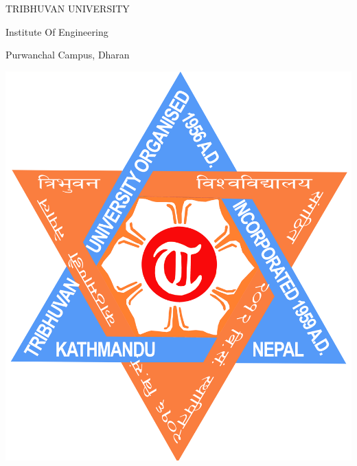 \documentclass[a4paper, 12pt ]{report}
\begin{document}
	\Large
	{
		{\bf
			\begin{center}TRIBHUVAN UNIVERSITY \end{center}
			\begin{center}Institute Of Engineering \end{center}
			\begin{center} Purwanchal Campus, Dharan\end{center}
		}
	}
	\vspace*{\baselineskip}
	
	\begin{center}\includegraphics[scale=0.05]{./Assets/Logo.png}\end{center}
	
\end{document}
